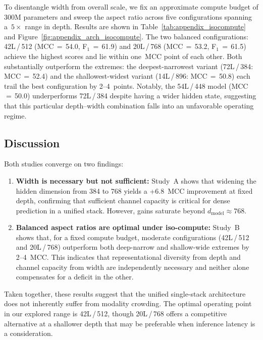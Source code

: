 To disentangle width from overall scale, we fix an approximate compute budget
of 300M parameters and sweep the aspect
ratio across five configurations spanning a~$5{\times}$ range in depth.
Results are shown in Table~\ref{tab:appendix_isocompute} and
Figure~\ref{fig:appendix_arch_isocompute}.
The two balanced configurations: 42L\,/\,512 (MCC\,$=$\,54.0,
F$_1$\,$=$\,61.9) and 20L\,/\,768 (MCC\,$=$\,53.2,
F$_1$\,$=$\,61.5) achieve the highest scores and lie within one~MCC point
of each other.  Both substantially outperform the extremes: the
deepest-narrowest variant (72L\,/\,384: MCC\,$=$\,52.4) and the
shallowest-widest variant (14L\,/\,896: MCC\,$=$\,50.8) each trail the best
configuration by 2--4~points.  Notably, the 54L\,/\,448 model
(MCC\,$=$\,50.0) under\-performs 72L\,/\,384 despite having a wider hidden
state, suggesting that this particular depth--width combination falls into an
unfavorable operating regime.

\subsection{Discussion}

Both studies converge on two findings:
\begin{enumerate}[nosep,leftmargin=*]
  \item \textbf{Width is necessary but not sufficient:}
        Study~A shows that widening the hidden dimension from 384 to 768
        yields a +6.8~MCC improvement at fixed depth, confirming that
        sufficient channel capacity is critical for dense prediction in a
        unified stack.  However, gains saturate beyond
        $d_{\text{model}} \approx 768$.

  \item \textbf{Balanced aspect ratios are optimal under iso-compute:}
        Study~B shows that, for a fixed compute budget, moderate
        configurations (42L\,/\,512 and 20L\,/\,768) outperform both
        deep-narrow and shallow-wide extremes by 2--4~MCC.  This indicates
        that representational diversity from depth and channel capacity from
        width are independently necessary and neither alone compensates for a
        deficit in the other.
\end{enumerate}
Taken together, these results suggest that the unified single-stack
architecture does not inherently suffer from modality crowding.  The optimal operating point in our
explored range is 42L\,/\,512, though 20L\,/\,768 offers a competitive
alternative at a shallower depth that may be preferable when inference latency
is a consideration.




